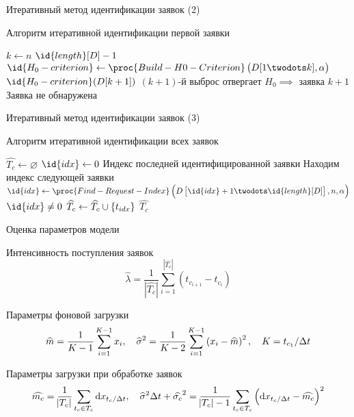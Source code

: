 \documentclass[utf8,handout]{beamer}
\begin{document}
\begin{frame}{Итеративный метод идентификации заявок (2)}
\begin{block}{Алгоритм итеративной идентификации первой заявки}
  \begin{codebox}
  \li \For $k \gets n$ \To $\id{length}[D] - 1$
  \li \Do
        $\id{H_0-criterion} \gets
          \proc{Build-H0-Criterion}\del{D[1 \twodots k], \alpha}$
  \li   \If {} $\id{H_0-criterion}(D[k+1])$
  \zi   \Then
          \Comment $(k+1)$-й выброс отвергает $H_0 \implies$ заявка      
  \li     \Return $k+1$
        \End
  \li   \End
  \li {} \Comment Заявка не обнаружена
  \end{codebox}
\end{block}
\end{frame}


\begin{frame}{Итеративный метод идентификации заявок (3)}
\begin{block}{Алгоритм итеративной идентификации всех заявок}
  \begin{codebox}
  \li $\widehat{T_c} \gets \varnothing$
  \li $\id{idx} \gets 0$ \Comment Индекс последней идентифицированной заявки
  \li \While {}
  \li \Do
        \Comment Находим индекс следующей заявки
  \li   $\id{idx} \gets \proc{Find-Request-Index}
            \del{D\sbr{\id{idx} + 1 \twodots \id{length}[D]}, 
            n, \alpha}$
  \li   \If $\id{idx} \neq 0$
  \li   \Then
          $\widehat{T_c} \gets \widehat{T_c} \cup \cbr{t_{idx}}$
  \li   \Else
          \Return $\widehat{T_c}$
        \End
      \End
  \end{codebox}
\end{block}
\end{frame}


\begin{frame}{Оценка параметров модели}

\begin{block}{Интенсивность поступления заявок}
$$\widehat{\lambda} = 
    \frac{1}{|\widehat{T_c}|} 
        \sum\limits_{i=1}^{|\widehat{T_c}|} (t_{c_{i+1}} - t_{c_i})$$
\end{block}
\begin{block}{Параметры фоновой загрузки}
$$
  \widehat{m} = \frac{1}{K-1} \sum\limits_{i=1}^{K-1} x_i, \quad
  \widehat{\sigma}^2 = 
      \frac{1}{K-2} \sum\limits_{i=1}^{K-1} \del{x_i - \widehat{m}}^2, \quad
  K = t_{c_1} / \Delta t
$$
\end{block}
\begin{block}{Параметры загрузки при обработке заявок}
$$
  \widehat{m_c} = \frac{1}{\envert{T_c}} \sum\limits_{t_c \in T_c} 
      \dif x_{t_c / \Delta t}, \quad
  \widehat{\sigma}^2 \Delta t + \widehat{\sigma_c}^2 = 
      \frac{1}{\envert{T_c} - 1} \sum\limits_{t_c \in T_c}
      \del{\dif x_{t_c / \Delta t} - \widehat{m_c}}^2
$$
\end{block}
\end{frame}
\end{document}
